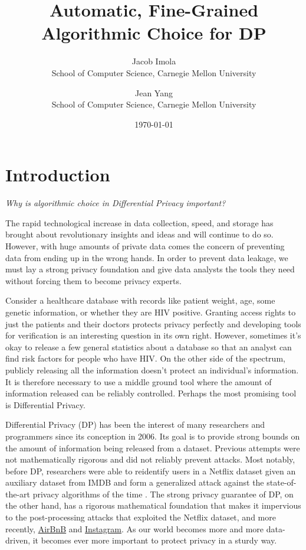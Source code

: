 \documentclass[11pt]{article}
\title{Automatic, Fine-Grained Algorithmic Choice for DP}
\date{\today}
\author{Jacob Imola\\ School of Computer Science, Carnegie Mellon University\and Jean Yang\\ School of Computer Science, Carnegie Mellon University}
\begin{document}
\maketitle
\section{Introduction}
\emph{Why is algorithmic choice in Differential Privacy important?}

The rapid technological increase in data collection, speed, and storage has brought about revolutionary insights and ideas and will continue to do so. However, with huge amounts of private data comes the concern of preventing data from ending up in the wrong hands. In order to prevent data leakage, we must lay a strong privacy foundation and give data analysts the tools they need without forcing them to become privacy experts.

Consider a healthcare database with records like patient weight, age, some genetic information, or whether they are HIV positive. Granting access rights to just the patients and their doctors protects privacy perfectly and developing tools for verification is an interesting question in its own right. However, sometimes it's okay to release a few general statistics about a database so that an analyst can find risk factors for people who have HIV. On the other side of the spectrum, publicly releasing all the information doesn't protect an individual's information. It is therefore necessary to use a middle ground tool where the amount of information released can be reliably controlled. Perhaps the most promising tool is Differential Privacy.

Differential Privacy (DP) has been the interest of many researchers and programmers since its conception in 2006. Its goal is to provide strong bounds on the amount of information being released from a dataset. Previous attempts were not mathematically rigorous and did not reliably prevent attacks. Most notably, before DP, researchers were able to reidentify users in a Netflix dataset given an auxiliary dataset from IMDB and form a generalized attack against the state-of-the-art privacy algorithms of the time \cite{Narayanan:2006}. The strong privacy guarantee of DP, on the other hand, has a rigorous mathematical foundation that makes it impervious to the post-processing attacks that exploited the Netflix dataset, and more recently, \href{https://hackernoon.com/how-to-rob-an-airbnb-252e7e7eda44}{AirBnB} and \href{https://gizmodo.com/this-is-almost-certainly-james-comey-s-twitter-account-1793843641}{Instagram}. As our world becomes more and more data-driven, it becomes ever more important to protect privacy in a sturdy way.
\end{document}
